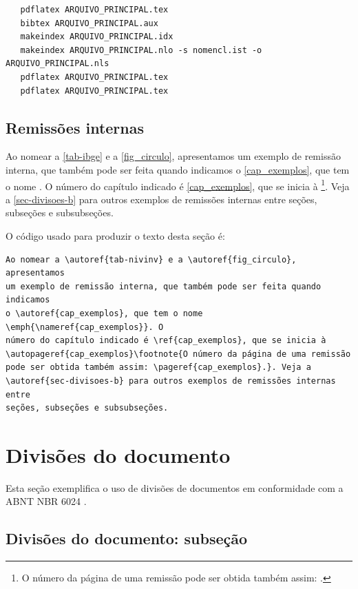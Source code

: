\begin{verbatim}
   pdflatex ARQUIVO_PRINCIPAL.tex
   bibtex ARQUIVO_PRINCIPAL.aux
   makeindex ARQUIVO_PRINCIPAL.idx 
   makeindex ARQUIVO_PRINCIPAL.nlo -s nomencl.ist -o ARQUIVO_PRINCIPAL.nls
   pdflatex ARQUIVO_PRINCIPAL.tex
   pdflatex ARQUIVO_PRINCIPAL.tex
\end{verbatim}

\subsection{Remissões internas}

Ao nomear a \autoref{tab-ibge} e a \autoref{fig_circulo}, apresentamos um exemplo de remissão interna, que também pode ser feita quando indicamos o
\autoref{cap_exemplos}, que tem o nome \emph{}. O número
do capítulo indicado é \ref{cap_exemplos}, que se inicia à
\footnote{O número da página de uma remissão pode ser
	obtida também assim:
	\pageref{cap_exemplos}.}.
Veja a \autoref{sec-divisoes-b} para outros exemplos de remissões internas entre
seções, subseções e subsubseções.

O código usado para produzir o texto desta seção é:

\begin{verbatim}
Ao nomear a \autoref{tab-nivinv} e a \autoref{fig_circulo}, apresentamos 
um exemplo de remissão interna, que também pode ser feita quando indicamos 
o \autoref{cap_exemplos}, que tem o nome \emph{\nameref{cap_exemplos}}. O
número do capítulo indicado é \ref{cap_exemplos}, que se inicia à 
\autopageref{cap_exemplos}\footnote{O número da página de uma remissão 
pode ser obtida também assim: \pageref{cap_exemplos}.}. Veja a 
\autoref{sec-divisoes-b} para outros exemplos de remissões internas entre 
seções, subseções e subsubseções.
\end{verbatim}

\section{Divisões do documento}\label{sec-divisoes-b}
Esta seção exemplifica o uso de divisões de documentos em conformidade com a ABNT NBR 6024  \cite{nbr6024}.
\subsection{Divisões do documento: subseção}\label{sec-divisoes-subsection}

